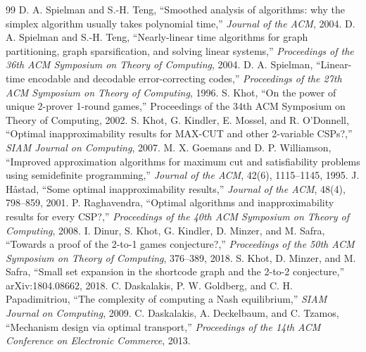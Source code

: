 \documentclass[11pt,oneside]{book}
\begin{document}
\begin{thebibliography}{99}
 D. A. Spielman and S.-H. Teng, ``Smoothed analysis of algorithms: why the simplex algorithm usually takes polynomial time,'' \emph{Journal of the ACM}, 2004.
 D. A. Spielman and S.-H. Teng, ``Nearly-linear time algorithms for graph partitioning, graph sparsification, and solving linear systems,'' \emph{Proceedings of the 36th ACM Symposium on Theory of Computing}, 2004.
 D. A. Spielman, ``Linear-time encodable and decodable error-correcting codes,'' \emph{Proceedings of the 27th ACM Symposium on Theory of Computing}, 1996.
 S. Khot, ``On the power of unique 2-prover 1-round games,'' Proceedings of the 34th ACM Symposium on Theory of Computing, 2002.
 S. Khot, G. Kindler, E. Mossel, and R. O'Donnell, ``Optimal inapproximability results for MAX-CUT and other 2-variable CSPs?,'' \emph{SIAM Journal on Computing}, 2007.
 M. X. Goemans and D. P. Williamson, ``Improved approximation algorithms for maximum cut and satisfiability problems using semidefinite programming,'' \emph{Journal of the ACM}, 42(6), 1115--1145, 1995.
 J. H\aa stad, ``Some optimal inapproximability results,'' \emph{Journal of the ACM}, 48(4), 798--859, 2001.
 P. Raghavendra, ``Optimal algorithms and inapproximability results for every CSP?,'' \emph{Proceedings of the 40th ACM Symposium on Theory of Computing}, 2008.
 I. Dinur, S. Khot, G. Kindler, D. Minzer, and M. Safra, ``Towards a proof of the 2-to-1 games conjecture?,'' \emph{Proceedings of the 50th ACM Symposium on Theory of Computing}, 376--389, 2018.
 S. Khot, D. Minzer, and M. Safra, ``Small set expansion in the shortcode graph and the 2-to-2 conjecture,'' arXiv:1804.08662, 2018.
 C. Daskalakis, P. W. Goldberg, and C. H. Papadimitriou, ``The complexity of computing a Nash equilibrium,'' \emph{SIAM Journal on Computing}, 2009.
 C. Daskalakis, A. Deckelbaum, and C. Tzamos, ``Mechanism design via optimal transport,'' \emph{Proceedings of the 14th ACM Conference on Electronic Commerce}, 2013.
\end{thebibliography}
\printindex
\end{document}
